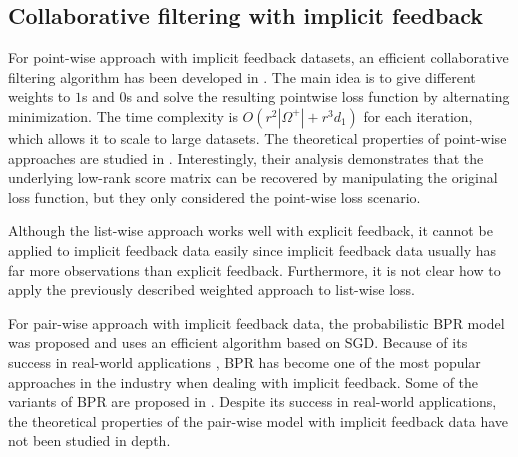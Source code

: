 \documentclass[conference]{IEEEtran}
\numberwithin{equation}{section}
\newtheorem{sampling strategy}{Sampling Strategy}
\begin{document}
\subsection{Collaborative filtering with implicit feedback}



For point-wise approach with implicit feedback datasets, an efficient collaborative filtering algorithm has been developed in \cite{cfimplicit}. The main idea is to give different weights to $1$s and $0$s and solve the resulting pointwise loss function by alternating minimization. The time complexity is $O(r^2|\Omega^+| + r^3 d_1)$ for each iteration, which allows it to scale to large datasets. The theoretical properties of point-wise approaches are studied in \cite{1bit,hsieh2015pu}. Interestingly, their analysis demonstrates that the underlying low-rank score matrix can be recovered by manipulating the original loss function, but they only considered the point-wise loss scenario. 

Although the list-wise approach works well with explicit feedback, it cannot be applied to implicit feedback data easily since implicit feedback data usually has far more observations than explicit feedback. Furthermore, it is not clear how to apply the previously described weighted approach to list-wise loss. 

 For pair-wise approach with implicit feedback data, the probabilistic BPR model \cite{bpr} was proposed and uses an efficient algorithm based on SGD.
 Because of its success in real-world applications \cite{yahoo!, millionsongs}, BPR has become one of the most popular approaches in the industry when dealing
 with implicit feedback. Some of the variants of BPR are proposed in \cite{bprsample,bprsample2}. Despite its success in real-world applications, the theoretical properties of the  pair-wise model with implicit feedback data have not been studied in depth. 
 
\end{document}
